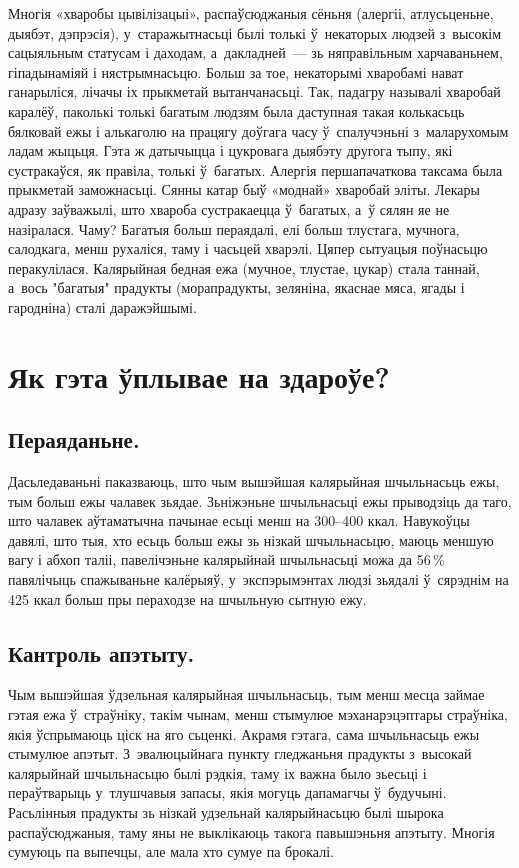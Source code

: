 
Многія «хваробы цывілізацыі», распаўсюджаныя сёньня (алергіі, атлусьценьне, дыябэт, дэпрэсія), у~старажытнасьці былі толькі ў~некаторых людзей з~высокім сацыяльным статусам і даходам, а~дакладней~--- зь няправільным харчаваньнем, гіпадынаміяй і нястрымнасьцю. Больш за тое, некаторымі хваробамі нават ганарыліся, лічачы іх прыкметай вытанчанасьці. Так, падагру называлі хваробай каралёў, паколькі толькі багатым людзям была даступная такая колькасьць бялковай ежы і алькаголю на працягу доўгага часу ў~спалучэньні з~маларухомым ладам жыцьця. Гэта ж датычыцца і цукровага дыябэту другога тыпу, які сустракаўся, як правіла, толькі ў~багатых. Алергія першапачаткова таксама была прыкметай заможнасьці. Сянны катар быў «моднай» хваробай эліты. Лекары адразу заўважылі, што хвароба сустракаецца ў~багатых, а~ў сялян яе не назіралася. Чаму? Багатыя больш пераядалі, елі больш тлустага, мучнога, салодкага, менш рухаліся, таму і часьцей хварэлі. Цяпер сытуацыя поўнасьцю перакулілася. Калярыйная бедная ежа (мучное, тлустае, цукар) стала таннай, а~вось "багатыя" прадукты (морапрадукты, зеляніна, якаснае мяса, ягады і гародніна) сталі даражэйшымі.

\section{Як гэта ўплывае на здароўе?}

\subsection{Пераяданьне.}
Дасьледаваньні паказваюць, што чым вышэйшая калярыйная шчыльнасьць ежы, тым больш ежы чалавек зьядае. Зьніжэньне шчыльнасьці ежы прыводзіць да таго, што чалавек аўтаматычна пачынае есьці менш на 300--400 ккал. Навукоўцы давялі, што тыя, хто есьць больш ежы зь нізкай шчыльнасьцю, маюць меншую вагу і абхоп таліі, павелічэньне калярыйнай шчыльнасьці можа да 56\,\% павялічыць спажываньне калёрыяў, у~экспэрымэнтах людзі зьядалі ў~сярэднім на 425 ккал больш пры пераходзе на шчыльную сытную ежу.

\subsection{Кантроль апэтыту.}
Чым вышэйшая ўдзельная калярыйная шчыльнасьць, тым менш месца займае гэтая ежа ў~страўніку, такім чынам, менш стымулюе мэханарэцэптары страўніка, якія ўспрымаюць ціск на яго сьценкі. Акрамя гэтага, сама шчыльнасьць ежы стымулюе апэтыт. З~эвалюцыйнага пункту гледжаньня прадукты з~высокай калярыйнай шчыльнасьцю былі рэдкія, таму іх важна было зьесьці і пераўтварыць у~тлушчавыя запасы, якія могуць дапамагчы ў~будучыні. Расьлінныя прадукты зь нізкай удзельнай калярыйнасьцю былі шырока распаўсюджаныя, таму яны не выклікаюць такога павышэньня апэтыту. Многія сумуюць па выпечцы, але мала хто сумуе па брокалі.

